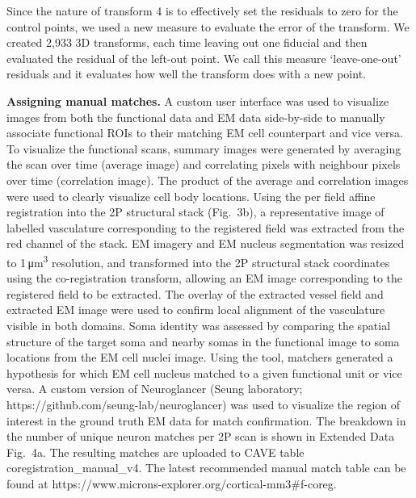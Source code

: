 \documentclass{article}
\begin{document}
Since the nature of transform 4 is to effectively set the residuals to zero for the control points, we used a new measure to evaluate the error of the transform. We created 2,933 3D transforms, each time leaving out one fiducial and then evaluated the residual of the left-out point. We call this measure ‘leave-one-out’ residuals and it evaluates how well the transform does with a new point.

\textbf{Assigning manual matches.} A custom user interface was used to visualize images from both the functional data and EM data side-by-side to manually associate functional ROIs to their matching EM cell counterpart and vice versa. To visualize the functional scans, summary images were generated by averaging the scan over time (average image) and correlating pixels with neighbour pixels over time (correlation image). The product of the average and correlation images were used to clearly visualize cell body locations. Using the per field affine registration into the 2P structural stack (Fig.~3b), a representative image of labelled vasculature corresponding to the registered field was extracted from the red channel of the stack. EM imagery and EM nucleus segmentation was resized to 1\,μm\textsuperscript{3} resolution, and transformed into the 2P structural stack coordinates using the co-registration transform, allowing an EM image corresponding to the registered field to be extracted. The overlay of the extracted vessel field and extracted EM image were used to confirm local alignment of the vasculature visible in both domains. Soma identity was assessed by comparing the spatial structure of the target soma and nearby somas in the functional image to soma locations from the EM cell nuclei image. Using the tool, matchers generated a hypothesis for which EM cell nucleus matched to a given functional unit or vice versa. A custom version of Neuroglancer (Seung laboratory; https://github.com/seung-lab/neuroglancer) was used to visualize the region of interest in the ground truth EM data for match confirmation. The breakdown in the number of unique neuron matches per 2P scan is shown in Extended Data Fig.~4a. The resulting matches are uploaded to CAVE table coregistration\_manual\_v4. The latest recommended manual match table can be found at https://www.microns-explorer.org/cortical-mm3\#f-coreg.
\end{document}
